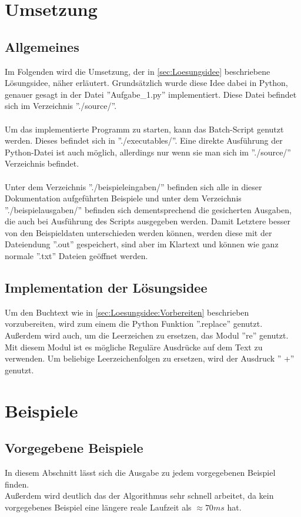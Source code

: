 \documentclass[a4paper,10pt,ngerman]{scrartcl}
\begin{document}
  \section{Umsetzung}
    \subsection{Allgemeines}
      Im Folgenden wird die Umsetzung, der in \cref{sec:Loesungsidee} beschriebene Lösungsidee, näher erläutert. Grundsätzlich wurde diese Idee dabei in Python, genauer gesagt in der Datei ''Aufgabe\_1.py'' implementiert. Diese Datei befindet sich im Verzeichnis ''./source/''.\\\\
      Um das implementierte Programm zu starten, kann das Batch-Script genutzt werden. Dieses befindet sich in ''./executables/''. Eine direkte Ausführung der Python-Datei ist auch möglich, allerdings nur wenn sie man sich im ''./source/'' Verzeichnis befindet.\\\\
      Unter dem Verzeichnis ''./beispieleingaben/'' befinden sich alle in dieser Dokumentation aufgeführten Beispiele und unter dem Verzeichnis ''./beispielausgaben/'' befinden sich dementsprechend die gesicherten Ausgaben, die auch bei Ausführung des Scripts ausgegeben werden. Damit Letztere besser von den Beispieldaten unterschieden werden können, werden diese mit der Dateiendung ''.out'' gespeichert, sind aber im Klartext und können wie ganz normale ''.txt'' Dateien geöffnet werden.
    \subsection{Implementation der Lösungsidee}
      Um den Buchtext wie in \cref{sec:Loesungsidee:Vorbereiten} beschrieben vorzubereiten, wird zum einem die Python Funktion ''.replace'' genutzt. Außerdem wird auch, um die Leerzeichen zu ersetzen, das Modul ''re'' genutzt. Mit diesem Modul ist es mögliche Reguläre Ausdrücke auf dem Text zu verwenden. Um beliebige Leerzeichenfolgen zu ersetzen, wird der Ausdruck '' +'' genutzt.
  \section{Beispiele\label{sec:Beispiele}}
    \subsection{Vorgegebene Beispiele}
      In diesem Abschnitt lässt sich die Ausgabe zu jedem vorgegebenen Beispiel finden.\\
      Außerdem wird deutlich das der Algorithmus sehr schnell arbeitet, da kein vorgegebenes Beispiel eine längere reale Laufzeit als $\approx70 ms$ hat.
\end{document}
